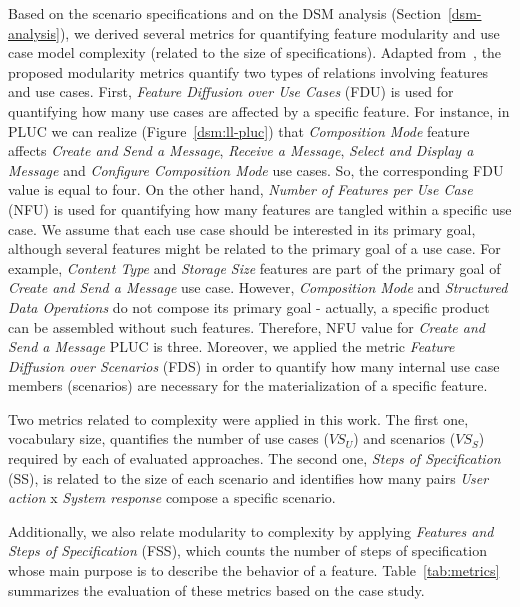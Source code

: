 \documentclass{acm_proc_article-sp}
\begin{document}
Based on the scenario specifications 
and on the DSM analysis (Section~\ref{dsm-analysis}), we derived several metrics for quantifying 
feature modularity and use case model complexity (related to the size of specifications). Adapted 
from~\cite{greenwood-ecoop-2007}, the proposed modularity metrics quantify two types of 
relations involving features and use cases. First, \emph{Feature Diffusion over Use Cases} (FDU)
is used for quantifying how many use cases are affected by a specific feature. For instance, in PLUC we 
can realize (Figure~\ref{dsm:ll-pluc}) that \emph{Composition Mode} feature affects \emph{Create and Send a Message}, 
\emph{Receive a Message}, \emph{Select and Display a Message} and \emph{Configure Composition Mode} use cases. So, the 
corresponding FDU value is equal to four. On the other hand, \emph{Number of Features per Use Case} (NFU)
is used for quantifying how many features are tangled within a specific use case. We assume that each use 
case should be interested in its primary goal, although several features might be related to the primary goal of a use case.
For example, \emph{Content Type} and \emph{Storage Size} features are part of the primary goal of \emph{Create and Send a
Message} use case. However, \emph{Composition Mode} and \emph{Structured Data Operations} do not compose
its primary goal - actually, a specific product can be assembled without such features. 
Therefore, NFU value for \emph{Create and Send a Message} PLUC is three. Moreover, 
we applied the metric \emph{Feature Diffusion over Scenarios} (FDS) in order 
to quantify how many internal use case members (scenarios) are necessary for the materialization of a specific feature.

Two metrics related to complexity were applied in this work. The first one, vocabulary size,
quantifies the number of use cases ($VS_{U}$) and scenarios ($VS_{S}$) required by each of evaluated
approaches. The second one, \emph{Steps of Specification} (SS), is related to the size of each 
scenario and identifies how many pairs \emph{User action} x \emph{System response} compose a specific scenario. 

Additionally, we also relate modularity to complexity by applying \emph{Features and Steps of Specification} (FSS), which 
counts the number of steps of specification whose main purpose is to describe the behavior of a feature. 
Table~\ref{tab:metrics} summarizes the evaluation of these metrics based on the case study.
\end{document}
